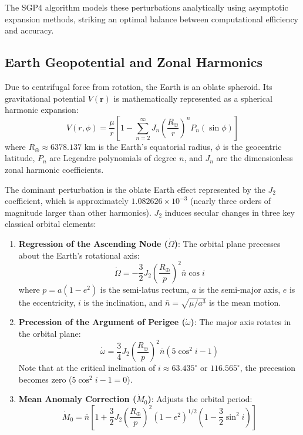 \documentclass[11pt,journal,onecolumn]{IEEEtran}
\begin{document}
The SGP4 algorithm models these perturbations analytically using asymptotic expansion methods, striking an optimal balance between computational efficiency and accuracy.

\subsection{Earth Geopotential and Zonal Harmonics}
Due to centrifugal force from rotation, the Earth is an oblate spheroid. Its gravitational potential $V(\mathbf{r})$ is mathematically represented as a spherical harmonic expansion:
\begin{equation}
V(r, \phi) = \frac{\mu}{r} \left[ 1 - \sum_{n=2}^{\infty} J_n \left( \frac{R_{\oplus}}{r} \right)^n P_n(\sin\phi) \right]
\label{eq:geopotential}
\end{equation}
where $R_{\oplus} \approx 6378.137\text{ km}$ is the Earth's equatorial radius, $\phi$ is the geocentric latitude, $P_n$ are Legendre polynomials of degree $n$, and $J_n$ are the dimensionless zonal harmonic coefficients.

The dominant perturbation is the oblate Earth effect represented by the $J_2$ coefficient, which is approximately $1.082626 \times 10^{-3}$ (nearly three orders of magnitude larger than other harmonics). $J_2$ induces secular changes in three key classical orbital elements:
\begin{enumerate}
    \item \textbf{Regression of the Ascending Node ($\dot{\Omega}$)}: The orbital plane precesses about the Earth's rotational axis:
    \begin{equation}
    \dot{\Omega} = -\frac{3}{2} J_2 \left( \frac{R_{\oplus}}{p} \right)^2 \bar{n} \cos i
    \label{eq:omega_dot}
    \end{equation}
    where $p = a(1 - e^2)$ is the semi-latus rectum, $a$ is the semi-major axis, $e$ is the eccentricity, $i$ is the inclination, and $\bar{n} = \sqrt{\mu/a^3}$ is the mean motion.
    
    \item \textbf{Precession of the Argument of Perigee ($\dot{\omega}$)}: The major axis rotates in the orbital plane:
    \begin{equation}
    \dot{\omega} = \frac{3}{4} J_2 \left( \frac{R_{\oplus}}{p} \right)^2 \bar{n} \left( 5\cos^2 i - 1 \right)
    \label{eq:arg_perigee}
    \end{equation}
    Note that at the critical inclination of $i \approx 63.435^\circ$ or $116.565^\circ$, the precession becomes zero ($5\cos^2 i - 1 = 0$).
    
    \item \textbf{Mean Anomaly Correction ($\dot{M}_0$)}: Adjusts the orbital period:
    \begin{equation}
    \dot{M}_0 = \bar{n} \left[ 1 + \frac{3}{2} J_2 \left( \frac{R_{\oplus}}{p} \right)^2 (1 - e^2)^{1/2} \left( 1 - \frac{3}{2}\sin^2 i \right) \right]
    \label{eq:mean_anomaly_rate}
    \end{equation}
\end{enumerate}
\end{document}
